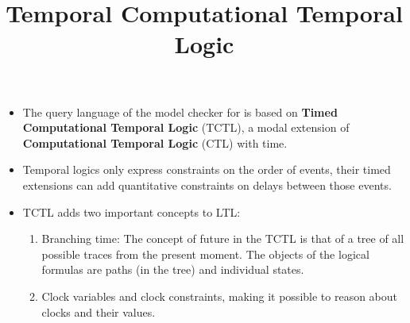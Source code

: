 \documentclass[wide]{slides}
\begin{document}
\begin{slide}
  \title{Temporal Computational Temporal Logic}

  \begin{itemize}

    \item The query language of the model checker for \UPPAAL is based
      on \textbf{Timed Computational Temporal Logic} (TCTL), a modal
      extension of \textbf{Computational Temporal Logic} (CTL) with
      time.

    \item Temporal logics only express constraints on the order of
      events, their timed extensions can add quantitative constraints
      on delays between those events.

    \item TCTL adds two important concepts to LTL:
      \begin{enumerate}

        \item Branching time: The concept of future in the TCTL is
          that of a tree of all possible traces from the present
          moment. The objects of the logical formulas are paths (in
          the tree) and individual states.

        \item Clock variables and clock constraints, making it
          possible to reason about clocks and their values.

      \end{enumerate}

  \end{itemize}

\end{slide}
\end{document}
